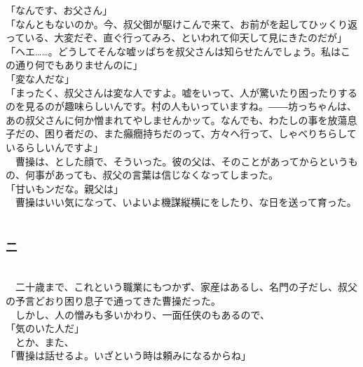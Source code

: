 \documentclass[
  paper=a5,
  fontsize=10pt,
  jafontsize=9.5pt,
  tate,                  %
  open_bracket_pos=nibu, %
]{jlreq}
\begin{document}
「なんです、お父さん」\\


「なんともないのか。今、叔父御が駆けこんで来て、お前がを起してひッくり返っている、大変だぞ、直ぐ行ってみろ、といわれて仰天して見にきたのだが」\\


「ヘエ……。どうしてそんな嘘ッぱちを叔父さんは知らせたんでしょう。私はこの通り何でもありませんのに」\\


「変な人だな」\\


「まったく、叔父さんは変な人ですよ。嘘をいって、人が驚いたり困ったりするのを見るのが趣味らしいんです。村の人もいっていますね。――坊っちゃんは、あの叔父さんに何か憎まれてやしませんかッて。なんでも、わたしの事を放蕩息子だの、困り者だの、また癲癇持ちだのって、方々へ行って、しゃべりちらしているらしいんですよ」\\


　曹操は、とした顔で、そういった。彼の父は、そのことがあってからというもの、何事があっても、叔父の言葉は信じなくなってしまった。\\


「甘いもンだな。親父は」\\


　曹操はいい気になって、いよいよ機謀縦横にをしたり、な日を送って育った。\\

\\

\subsubsection{二}

\\


　二十歳まで、これという職業にもつかず、家産はあるし、名門の子だし、叔父の予言どおり困り息子で通ってきた曹操だった。\\


　しかし、人の憎みも多いかわり、一面任侠のもあるので、\\


「気のいた人だ」\\


　とか、また、\\


「曹操は話せるよ。いざという時は頼みになるからね」\\
\end{document}
